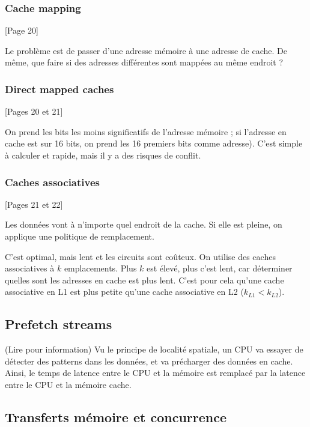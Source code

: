		\subsubsection{Cache mapping}
		
		[Page 20]
		
		Le problème est de passer d'une adresse mémoire à une adresse de cache. De même, que faire si des adresses différentes sont mappées au même endroit ?
		
		\subsubsection{Direct mapped caches}
		
		[Pages 20 et 21]
		
		On prend les bits les moins significatifs de l'adresse mémoire ; si l'adresse en cache est sur 16 bits, on prend les 16 premiers bits comme adresse). C'est simple à calculer et rapide, mais il y a des risques de conflit.
		
		\subsubsection{Caches associatives}
			
		[Pages 21 et 22]
		
		Les données vont à n'importe quel endroit de la cache. Si elle est pleine, on applique une politique de remplacement.
		
		C'est optimal, mais lent et les circuits sont coûteux. On utilise des caches associatives à $k$ emplacements. Plus $k$ est élevé, plus c'est lent, car déterminer quelles sont les adresses en cache est plus lent. C'est pour cela qu'une cache associative en L1 est plus petite qu'une cache associative en L2 ($k_{L1} < k_{L2}$).
	
	\subsection{Prefetch streams}
	
	(Lire pour information) Vu le principe de localité spatiale, un CPU va essayer de détecter des patterns dans les données, et va précharger des données en cache. Ainsi, le temps de latence entre le CPU et la mémoire est remplacé par la latence entre le CPU et la mémoire cache.
	
	\subsection{Transferts mémoire et concurrence}
	

